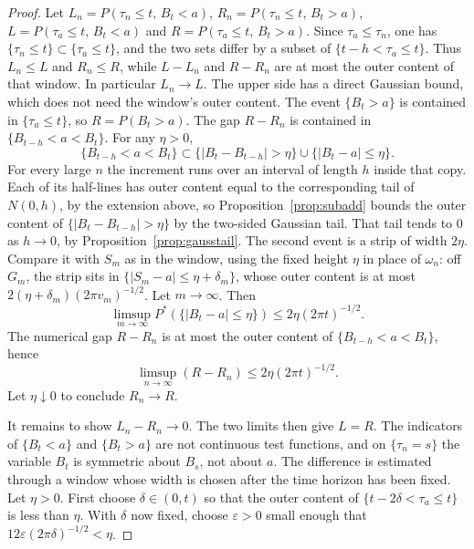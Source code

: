 \begin{proof}
Let $L_n=P(\tau_n\le t,\,B_t<a)$, $R_n=P(\tau_n\le t,\,B_t>a)$, $L=P(\tau_a\le t,\,B_t<a)$ and $R=P(\tau_a\le t,\,B_t>a)$. Since $\tau_a\le\tau_n$, one has $\{\tau_n\le t\}\subset\{\tau_a\le t\}$, and the two sets differ by a subset of $\{t-h<\tau_a\le t\}$. Thus $L_n\le L$ and $R_n\le R$, while $L-L_n$ and $R-R_n$ are at most the outer content of that window. In particular $L_n\to L$. The upper side has a direct Gaussian bound, which does not need the window's outer content. The event $\{B_t>a\}$ is contained in $\{\tau_a\le t\}$, so $R=P(B_t>a)$. The gap $R-R_n$ is contained in $\{B_{t-h}<a<B_t\}$. For any $\eta>0$,
\[
 \{B_{t-h}<a<B_t\}
 \subset\{|B_t-B_{t-h}|>\eta\}\cup\{|B_t-a|\le\eta\}.
\]
For every large $n$ the increment runs over an interval of length $h$ inside that copy. Each of its half-lines has outer content equal to the corresponding tail of $N(0,h)$, by the extension above, so Proposition~\ref{prop:subadd} bounds the outer content of $\{|B_t-B_{t-h}|>\eta\}$ by the two-sided Gaussian tail. That tail tends to $0$ as $h\to0$, by Proposition~\ref{prop:gausstail}. The second event is a strip of width $2\eta$. Compare it with $S_m$ as in the window, using the fixed height $\eta$ in place of $\omega_n$: off $G_m$, the strip sits in $\{|S_m-a|\le\eta+\delta_m\}$, whose outer content is at most $2(\eta+\delta_m)(2\pi v_m)^{-1/2}$. Let $m\to\infty$. Then
\[
 \limsup_{m\to\infty}P^*(\{|B_t-a|\le\eta\})
 \le 2\eta(2\pi t)^{-1/2}.
\]
The numerical gap $R-R_n$ is at most the outer content of $\{B_{t-h}<a<B_t\}$, hence
\[
 \limsup_{n\to\infty}(R-R_n)\le 2\eta(2\pi t)^{-1/2}.
\]
Let $\eta\downarrow0$ to conclude $R_n\to R$.

It remains to show $L_n-R_n\to0$. The two limits then give $L=R$. The indicators of $\{B_t<a\}$ and $\{B_t>a\}$ are not continuous test functions, and on $\{\tau_n=s\}$ the variable $B_t$ is symmetric about $B_s$, not about $a$. The difference is estimated through a window whose width is chosen after the time horizon has been fixed. Let $\eta>0$. First choose $\delta\in(0,t)$ so that the outer content of $\{t-2\delta<\tau_a\le t\}$ is less than $\eta$. With $\delta$ now fixed, choose $\varepsilon>0$ small enough that $12\varepsilon(2\pi\delta)^{-1/2}<\eta$.


\end{proof}
